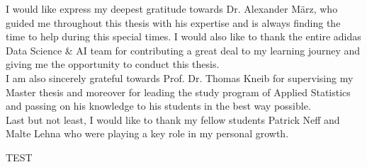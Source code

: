 
\vspace{3cm}



I would like express my deepest gratitude towards Dr. Alexander März, who guided me throughout this thesis with his expertise and is always finding the time to help during this special times. I would also like to thank the entire adidas Data Science \& AI team for contributing a great deal to my learning journey and giving me the opportunity to conduct this thesis.\\
I am also sincerely grateful towards Prof. Dr. Thomas Kneib for supervising my Master thesis and moreover for leading the study program of Applied Statistics and passing on his knowledge to his students in the best way possible.\\
Last but not least, I would like to thank my fellow students Patrick Neff and Malte Lehna who were playing a key role in my personal growth. 

\vspace{1cm}


TEST



